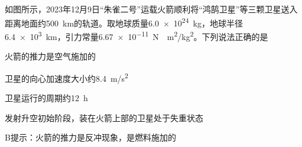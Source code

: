 如图所示，2023年12月9日“朱雀二号”运载火箭顺利将“鸿鹄卫星”等三颗卫星送入距离地面约\qty{500}{km}的轨道。取地球质量\qty{6.0e24}{kg}，地球半径\qty{6.4e3}{km}，引力常量\qty{6.67e-11}{N\cdot m^2/kg^2}。下列说法正确的是\paren[]
\begin{choices}
	\item 火箭的推力是空气施加的
	\item 卫星的向心加速度大小约\qty{8.4}{m/s^2}
	\item 卫星运行的周期约\qty{12}{h}
	\item 发射升空初始阶段，装在火箭上部的卫星处于失重状态
\end{choices}
\begin{answer}
	B\qquad 提示：火箭的推力是反冲现象，是燃料施加的
\end{answer}